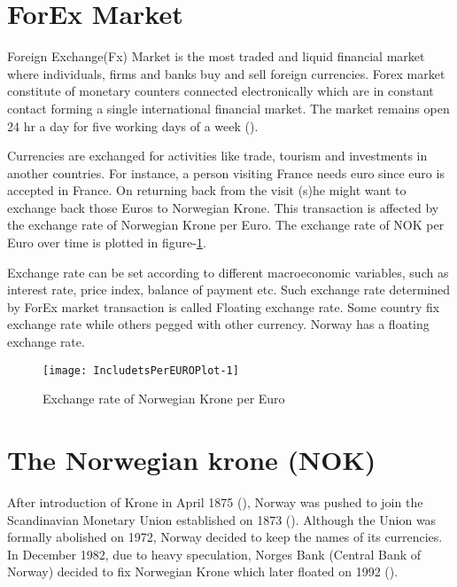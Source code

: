 \documentclass[12pt, lot, lof]{thesis}\usepackage[]{graphicx}\usepackage[]{color}
\makeatletter
\def\maxwidth{ %
  \ifdim\Gin@nat@width>\linewidth
    \linewidth
  \else
    \Gin@nat@width
  \fi
}
\makeatother
\begin{document}
\section{ForEx Market}
\label{sec:forexMarket}
Foreign Exchange(Fx) Market is the most traded and liquid financial market where individuals, firms and banks buy and sell foreign currencies. Forex market constitute of monetary counters connected electronically which are in constant contact forming a single international financial market. The market remains open 24 hr a day for five working days of a week (\cite{fxIntro}). 

Currencies are exchanged for activities like trade, tourism and investments in another countries. For instance, a person visiting France needs euro since euro is accepted in France. On returning back from the visit (s)he might want to exchange back those Euros to Norwegian Krone. This transaction is affected by the exchange rate of Norwegian Krone per Euro. The exchange rate of NOK per Euro over time is plotted in figure-\ref{fig:tsPerEUROPlot}.

Exchange rate can be set according to different macroeconomic variables, such as interest rate, price index, balance of payment etc. Such exchange rate determined by ForEx market transaction is called Floating exchange rate. Some country fix exchange rate while others pegged with other currency. Norway has a floating exchange rate.

\begin{Schunk}
\begin{figure}

{\centering \texttt{[image: IncludetsPerEUROPlot-1]} 

}

\caption[Exchange rate of Norwegian Krone per Euro]{Exchange rate of Norwegian Krone per Euro\label{fig:tsPerEUROPlot}}
\end{figure}
\end{Schunk}

\section{The Norwegian krone (NOK)}
\label{sec:KroneInro}
After introduction of Krone in April 1875 (\cite{NorBnkHistory}), Norway was pushed to join the Scandinavian Monetary Union established on 1873 (\cite{nokHistoryOanda}). Although the Union was formally abolished on 1972, Norway decided to keep the names of its currencies. In December 1982, due to heavy speculation, Norges Bank (Central Bank of Norway) decided to fix Norwegian Krone which later floated on 1992 (\cite{NorBnkHistory}).
\end{document}
